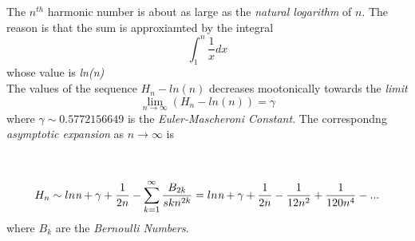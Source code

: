 \documentclass[2pt]{article}
\begin{document}
The $n^{th}$ harmonic number is about as large as the \emph{natural logarithm} of $n$. The reason is that the sum is approxiamted by the integral
\begin{equation}
\int_{1}^{n} \frac{1}{x} dx
\end{equation}
whose value is \emph{ln(n)} \\
The values of the sequence $H_{n} - ln(n)$ decreases mootonically towards the \emph{limit}
\begin{equation}
\lim_{n \to \infty} (H_{n} - ln(n)) = \gamma
\end{equation}
where $\gamma \sim 0.5772156649$ is the \emph{Euler-Mascheroni Constant}. The correspondng \emph{asymptotic expansion} as $n \to \infty$ is
\\\\\\
\begin{equation}
H_{n} \sim ln \emph{n} + \gamma + \frac{1}{2n}-\sum_{k=1}^{\infty} \frac{B_{2k}}{skn^{2k}}=ln \emph{n} + \gamma + \frac{1}{2n} - \frac{1}{12n^2}+\frac{1}{120n^4}-...
\end{equation}
where $B_{k}$ are the \emph{Bernoulli Numbers}.
\end{document}
